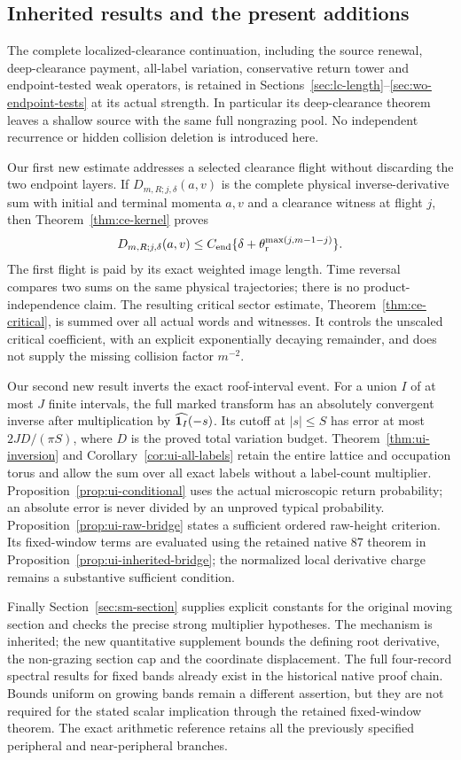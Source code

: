 \subsection*{Inherited results and the present additions}
The complete localized-clearance continuation, including the source
renewal, deep-clearance payment, all-label variation, conservative
return tower and endpoint-tested weak operators, is retained in
Sections~\ref{sec:lc-length}--\ref{sec:wo-endpoint-tests} at its actual
strength. In particular its deep-clearance theorem leaves a shallow
source with the same full nongrazing pool. No independent recurrence
or hidden collision deletion is introduced here.

Our first new estimate addresses a selected clearance flight without
discarding the two endpoint layers. If $D_{m,R;j,\delta}(a,v)$ is the
complete physical inverse-derivative sum with initial and terminal
momenta $a,v$ and a clearance witness at flight $j$, then
Theorem~\ref{thm:ce-kernel} proves
\[
 D_{m,R;j,\delta}(a,v)
 \le C_{\rm end}\{\delta+\theta_{\rm r}^{\max(j,m-1-j)}\}.
\]
The first flight is paid by its exact weighted image length.
Time reversal compares two sums on the same physical trajectories;
there is no product-independence claim. The resulting critical
sector estimate, Theorem~\ref{thm:ce-critical}, is summed over all
actual words and witnesses. It controls the unscaled critical
coefficient, with an explicit exponentially decaying remainder,
and does not supply the missing collision factor $m^{-2}$.

Our second new result inverts the exact roof-interval event. For a
union $I$ of at most $J$ finite intervals, the full marked transform
has an absolutely convergent inverse after multiplication by
$\widehat{\mathbf1_I}(-s)$. Its cutoff at $|s|\le S$ has error at most
$2JD/(\pi S)$, where $D$ is the proved total variation budget.
Theorem~\ref{thm:ui-inversion} and Corollary~\ref{cor:ui-all-labels}
retain the entire lattice and occupation torus and allow the sum
over all exact labels without a label-count multiplier.
Proposition~\ref{prop:ui-conditional} uses the actual microscopic
return probability; an absolute error is never divided by an
unproved typical probability. Proposition~\ref{prop:ui-raw-bridge}
states a sufficient ordered raw-height criterion. Its fixed-window
terms are evaluated using the retained native 87 theorem in
Proposition~\ref{prop:ui-inherited-bridge}; the normalized local
derivative charge remains a substantive sufficient condition.

Finally Section~\ref{sec:sm-section} supplies explicit constants
for the original moving section and checks the precise strong
multiplier hypotheses. The mechanism is inherited; the new
quantitative supplement bounds the defining root derivative,
the non-grazing section cap and the coordinate displacement.
The full four-record spectral results for fixed bands already
exist in the historical native proof chain. Bounds uniform on
growing bands remain a different assertion, but they are not
required for the stated scalar implication through the retained
fixed-window theorem. The exact arithmetic reference retains all
the previously specified peripheral and near-peripheral branches.

